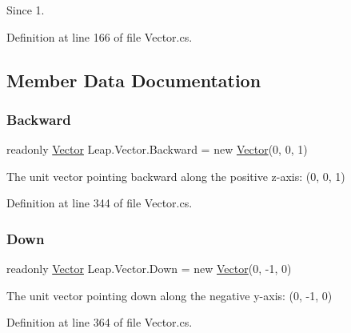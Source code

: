 \begin{DoxySince}{Since}
1. 
\end{DoxySince}


Definition at line 166 of file Vector.\+cs.



\subsection{Member Data Documentation}
\mbox{\label{struct_leap_1_1_vector_ad8dd1ac8e87611c590c9dcc58f8fdf8c}} 
\subsubsection{\texorpdfstring{Backward}{Backward}}
{\footnotesize\ttfamily readonly \mbox{\hyperlink{struct_leap_1_1_vector}{Vector}} Leap.\+Vector.\+Backward = new \mbox{\hyperlink{struct_leap_1_1_vector}{Vector}}(0, 0, 1)\hspace{0.3cm}{\ttfamily [static]}}



The unit vector pointing backward along the positive z-\/axis\+: (0, 0, 1) 



Definition at line 344 of file Vector.\+cs.

\mbox{\label{struct_leap_1_1_vector_a5f080cc88e908cd5d4c3e593767cdb17}} 
\subsubsection{\texorpdfstring{Down}{Down}}
{\footnotesize\ttfamily readonly \mbox{\hyperlink{struct_leap_1_1_vector}{Vector}} Leap.\+Vector.\+Down = new \mbox{\hyperlink{struct_leap_1_1_vector}{Vector}}(0, -\/1, 0)\hspace{0.3cm}{\ttfamily [static]}}



The unit vector pointing down along the negative y-\/axis\+: (0, -\/1, 0) 



Definition at line 364 of file Vector.\+cs.

\mbox{\label{struct_leap_1_1_vector_a2ec88fe91f8086e18e78ee2dcc078525}} 
